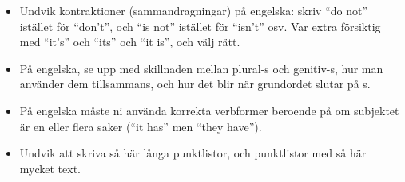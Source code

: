 \begin{itemize}
\item Undvik kontraktioner (sammandragningar) på engelska: skriv ``do not'' istället för ``don't'', och ``is not'' istället för ``isn't'' osv. Var extra försiktig med ``it's'' och ``its'' och ``it is'', och välj rätt.

  
\item På engelska, se upp med skillnaden mellan plural-s och genitiv-s, hur man an\-vän\-der dem tillsammans, och hur det blir när grundordet slutar på s.

\item På engelska måste ni använda korrekta verbformer beroende på om subjektet är en eller flera saker (``it has'' men ``they have'').

\item Undvik att skriva så här långa punktlistor, och punktlistor med så här mycket text.
\end{itemize}


